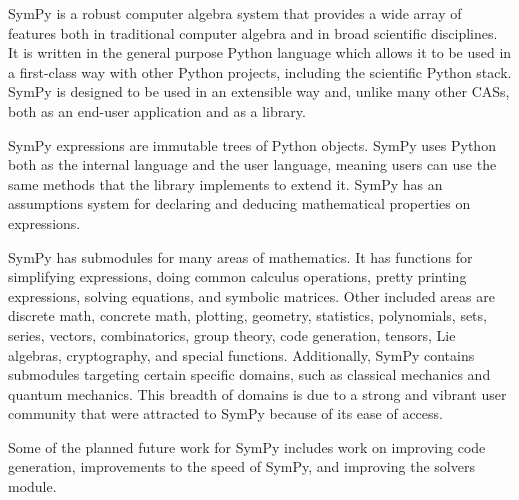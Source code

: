 SymPy is a robust computer algebra system that provides a wide array of
features both in traditional computer algebra and in broad scientific
disciplines. It is written in the general purpose Python language
which allows it to be used in a first-class way with other Python projects,
including the scientific Python stack. SymPy is designed to be used in an
extensible way and, unlike many other CASs, both as an end-user application and
as a library.

SymPy expressions are immutable trees of Python objects. SymPy uses Python both
as the internal language and the user language, meaning users can use the same
methods that the library implements to extend it. SymPy has an assumptions
system for declaring and deducing mathematical properties on expressions.

SymPy has submodules for many areas of mathematics. It has functions for
simplifying expressions, doing common calculus operations, pretty printing
expressions, solving equations, and symbolic matrices. Other included areas
are discrete math, concrete math, plotting, geometry, statistics,
polynomials, sets, series, vectors, combinatorics, group theory, code
generation, tensors, Lie algebras, cryptography, and special functions.
Additionally, SymPy contains submodules targeting certain specific domains,
such as classical mechanics and quantum mechanics.  This breadth of domains is
due to a strong and vibrant user community that were attracted to SymPy because
of its ease of access.


Some of the planned future work for SymPy includes work on improving code
generation, improvements to the speed of SymPy, and improving the solvers
module.

